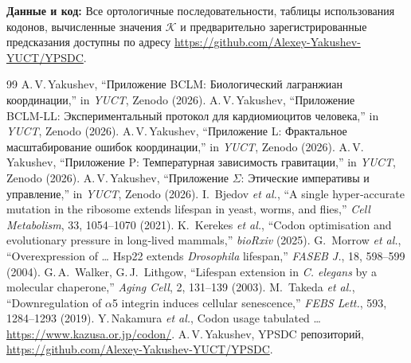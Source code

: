 \documentclass[12pt,a4paper]{article}
\newcommand{\REL}{\mathcal{K}}          %
\begin{document}
	\vspace{0.5cm}
	\noindent\textbf{Данные и код:} Все ортологичные последовательности, таблицы использования кодонов, вычисленные значения \(\REL\) и предварительно зарегистрированные предсказания доступны по адресу \url{https://github.com/Alexey-Yakushev-YUCT/YPSDC}.
	
	\begin{thebibliography}{99}
		 A.\,V.\,Yakushev, ``Приложение BCLM: Биологический лагранжиан координации,'' in \emph{YUCT}, Zenodo (2026).
		 A.\,V.\,Yakushev, ``Приложение BCLM‑LL: Экспериментальный протокол для кардиомиоцитов человека,'' in \emph{YUCT}, Zenodo (2026).
		 A.\,V.\,Yakushev, ``Приложение L: Фрактальное масштабирование ошибок координации,'' in \emph{YUCT}, Zenodo (2026).
		 A.\,V.\,Yakushev, ``Приложение P: Температурная зависимость гравитации,'' in \emph{YUCT}, Zenodo (2026).
		 A.\,V.\,Yakushev, ``Приложение \(\Sigma\): Этические императивы и управление,'' in \emph{YUCT}, Zenodo (2026).
		 I.~Bjedov \emph{et al.}, ``A single hyper‑accurate mutation in the ribosome extends lifespan in yeast, worms, and flies,'' \emph{Cell Metabolism}, 33, 1054–1070 (2021).
		 K.~Kerekes \emph{et al.}, ``Codon optimisation and evolutionary pressure in long‑lived mammals,'' \emph{bioRxiv} (2025).
		 G.~Morrow \emph{et al.}, ``Overexpression of … Hsp22 extends \textit{Drosophila} lifespan,'' \emph{FASEB J.}, 18, 598–599 (2004).
		 G.\,A.~Walker, G.\,J.~Lithgow, ``Lifespan extension in \textit{C. elegans} by a molecular chaperone,'' \emph{Aging Cell}, 2, 131–139 (2003).
		 M.~Takeda \emph{et al.}, ``Downregulation of \(\alpha\)5 integrin induces cellular senescence,'' \emph{FEBS Lett.}, 593, 1284–1293 (2019).
		 Y.\,Nakamura \emph{et al.}, Codon usage tabulated … \url{https://www.kazusa.or.jp/codon/}.
		 A.\,V.\,Yakushev, YPSDC репозиторий, \url{https://github.com/Alexey-Yakushev-YUCT/YPSDC}.
	\end{thebibliography}
	
\end{document}
